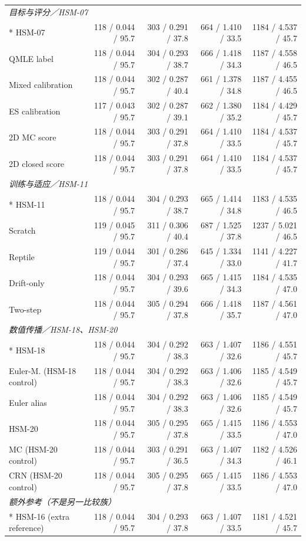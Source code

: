 \begin{longtable}{@{}p{.25\linewidth}rrrr@{}}
\midrule
\multicolumn{5}{l}{\textit{目标与评分／HSM-07}}\\*
HSM-07 & 118 / 0.044 / 95.7 & 303 / 0.291 / 37.8 & 664 / 1.410 / 33.5 & 1184 / 4.537 / 45.7\\
QMLE label & 118 / 0.044 / 95.7 & 304 / 0.293 / 38.7 & 666 / 1.418 / 34.3 & 1187 / 4.558 / 46.5\\
Mixed calibration & 118 / 0.044 / 95.7 & 302 / 0.287 / 40.4 & 661 / 1.378 / 34.8 & 1187 / 4.455 / 46.5\\
ES calibration & 117 / 0.043 / 95.7 & 302 / 0.287 / 39.1 & 662 / 1.380 / 35.2 & 1184 / 4.429 / 45.7\\
2D MC score & 118 / 0.044 / 95.7 & 303 / 0.291 / 37.8 & 664 / 1.410 / 33.5 & 1184 / 4.537 / 45.7\\
2D closed score & 118 / 0.044 / 95.7 & 303 / 0.291 / 37.8 & 664 / 1.410 / 33.5 & 1184 / 4.537 / 45.7\\
\midrule
\multicolumn{5}{l}{\textit{训练与适应／HSM-11}}\\*
HSM-11 & 118 / 0.044 / 95.7 & 304 / 0.293 / 38.7 & 665 / 1.414 / 34.8 & 1183 / 4.535 / 46.5\\
Scratch & 119 / 0.045 / 95.7 & 311 / 0.306 / 40.4 & 687 / 1.525 / 37.8 & 1237 / 5.021 / 46.5\\
Reptile & 119 / 0.044 / 95.7 & 301 / 0.286 / 37.4 & 645 / 1.334 / 33.0 & 1141 / 4.227 / 41.7\\
Drift-only & 118 / 0.044 / 95.7 & 304 / 0.293 / 39.6 & 665 / 1.415 / 34.3 & 1184 / 4.535 / 47.0\\
Two-step & 118 / 0.044 / 95.7 & 305 / 0.294 / 37.8 & 666 / 1.418 / 35.7 & 1187 / 4.561 / 47.0\\
\midrule
\multicolumn{5}{l}{\textit{数值传播／HSM-18、HSM-20}}\\*
HSM-18 & 118 / 0.044 / 95.7 & 304 / 0.292 / 38.3 & 663 / 1.407 / 32.6 & 1186 / 4.551 / 45.7\\
Euler-M. (HSM-18 control) & 118 / 0.044 / 95.7 & 304 / 0.292 / 38.3 & 663 / 1.406 / 32.6 & 1185 / 4.549 / 45.7\\
Euler alias & 118 / 0.044 / 95.7 & 304 / 0.292 / 38.3 & 663 / 1.406 / 32.6 & 1185 / 4.549 / 45.7\\
HSM-20 & 118 / 0.044 / 95.7 & 305 / 0.295 / 37.8 & 665 / 1.415 / 33.5 & 1186 / 4.553 / 47.0\\
MC (HSM-20 control) & 118 / 0.044 / 95.7 & 303 / 0.291 / 36.5 & 663 / 1.407 / 34.3 & 1182 / 4.526 / 46.1\\
CRN (HSM-20 control) & 118 / 0.044 / 95.7 & 305 / 0.295 / 37.8 & 665 / 1.415 / 33.5 & 1186 / 4.553 / 47.0\\
\midrule
\multicolumn{5}{l}{\textit{额外参考（不是另一比较族）}}\\*
HSM-16 (extra reference) & 118 / 0.044 / 95.7 & 304 / 0.293 / 37.8 & 663 / 1.407 / 33.5 & 1181 / 4.521 / 45.7\\
\end{longtable}
\endgroup
\Needspace{.65\textheight}

